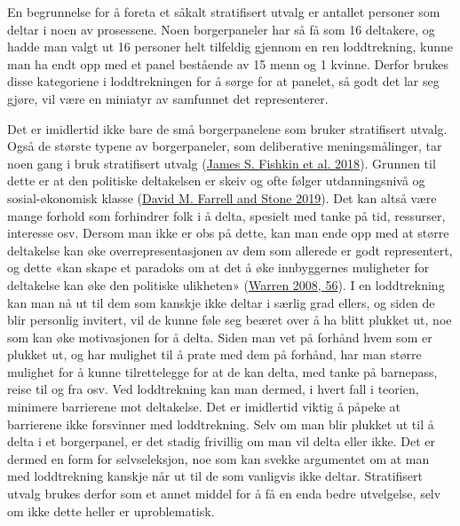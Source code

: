 \documentclass[
  12pt,
  a4paper, 12pt]{article}
\begin{document}
En begrunnelse for å foreta et såkalt stratifisert utvalg er antallet personer som deltar i noen av prosessene. Noen borgerpaneler har så få som 16 deltakere, og hadde man valgt ut 16 personer helt tilfeldig gjennom en ren loddtrekning, kunne man ha endt opp med et panel bestående av 15 menn og 1 kvinne. Derfor brukes disse kategoriene i loddtrekningen for å sørge for at panelet, så godt det lar seg gjøre, vil være en miniatyr av samfunnet det representerer.

Det er imidlertid ikke bare de små borgerpanelene som bruker stratifisert utvalg. Også de største typene av borgerpaneler, som deliberative meningsmålinger, tar noen gang i bruk stratifisert utvalg (\protect\hyperlink{ref-fishkin_deliberative_2018}{James S. Fishkin et al. 2018}). Grunnen til dette er at den politiske deltakelsen er skeiv og ofte følger utdanningsnivå og sosial-økonomisk klasse (\protect\hyperlink{ref-farrell_sortition_2019}{David M. Farrell and Stone 2019}). Det kan altså være mange forhold som forhindrer folk i å delta, spesielt med tanke på tid, ressurser, interesse osv. Dersom man ikke er obs på dette, kan man ende opp med at større deltakelse kan øke overrepresentasjonen av dem som allerede er godt representert, og dette «kan skape et paradoks om at det å øke innbyggernes muligheter for deltakelse kan øke den politiske ulikheten» (\protect\hyperlink{ref-warren_citizen_2008}{Warren 2008, 56}). I en loddtrekning kan man nå ut til dem som kanskje ikke deltar i særlig grad ellers, og siden de blir personlig invitert, vil de kunne føle seg beæret over å ha blitt plukket ut, noe som kan øke motivasjonen for å delta. Siden man vet på forhånd hvem som er plukket ut, og har mulighet til å prate med dem på forhånd, har man større mulighet for å kunne tilrettelegge for at de kan delta, med tanke på barnepass, reise til og fra osv. Ved loddtrekning kan man dermed, i hvert fall i teorien, minimere barrierene mot deltakelse. Det er imidlertid viktig å påpeke at barrierene ikke forsvinner med loddtrekning. Selv om man blir plukket ut til å delta i et borgerpanel, er det stadig frivillig om man vil delta eller ikke. Det er dermed en form for selvseleksjon, noe som kan svekke argumentet om at man med loddtrekning kanskje når ut til de som vanligvis ikke deltar. Stratifisert utvalg brukes derfor som et annet middel for å få en enda bedre utvelgelse, selv om ikke dette heller er uproblematisk.
\end{document}
